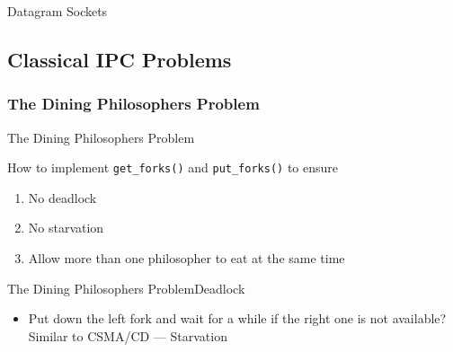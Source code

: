 \begin{frame}{Datagram Sockets}
\begin{center}
\end{center}
\end{frame}

\subsection{Classical IPC Problems}
\label{sec:class-ipc-probl}

\subsubsection{The Dining Philosophers Problem}
\label{sec:dining-phil-probl}

\begin{frame}{The Dining Philosophers Problem}
  \begin{minipage}{.49\linewidth}
    \begin{center}
    \end{center}
  \end{minipage} \hfill
  \begin{minipage}{.49\linewidth}
    \begin{center}
    \end{center}
  \end{minipage}
  
  How to implement \texttt{get\_forks()} and \texttt{put\_forks()} to ensure
  \begin{enumerate}
  \item No deadlock
  \item No starvation
  \item Allow more than one philosopher to eat at the same time
  \end{enumerate}
\end{frame}

\begin{frame}{The Dining Philosophers Problem}{Deadlock}
  \begin{center}
  \end{center}
  \begin{itemize}
  \item Put down the left fork and wait for a while if the right one is not available?
    Similar to CSMA/CD --- Starvation
  \end{itemize}
\end{frame}

